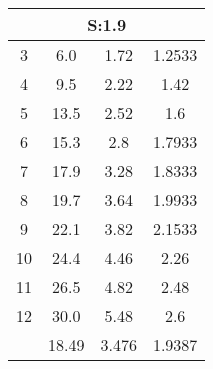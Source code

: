 
\begin{table}[H]
\begin{tabular}{c|ccc}
\multicolumn{4}{c}{S:1.9}\\\hline
3 & 6.0 & 1.72 & 1.2533\\
4 & 9.5 & 2.22 & 1.42\\
5 & 13.5 & 2.52 & 1.6\\
6 & 15.3 & 2.8 & 1.7933\\
7 & 17.9 & 3.28 & 1.8333\\
8 & 19.7 & 3.64 & 1.9933\\
9 & 22.1 & 3.82 & 2.1533\\
10 & 24.4 & 4.46 & 2.26\\
11 & 26.5 & 4.82 & 2.48\\
12 & 30.0 & 5.48 & 2.6\\
\hline
& 18.49 & 3.476 & 1.9387\\
\end{tabular}
\end{table}